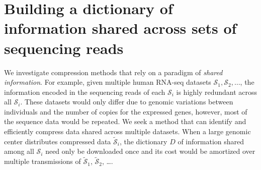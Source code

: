 \documentclass[12pt]{cmuthesis}
\begin{document}
  \begin{table}[ht]
    \centering
    \caption{\textbf{Performance of command-line compression tools on sequencing reads.} Reordering the reads improves reads compression by up to 5 times. Sizes shown are in megabytes.}
    \label{tab:compression:clt}
  \end{table}

\section{Building a dictionary of information shared across sets of sequencing reads}

  \newcommand{\seq}{\mathcal{S}\xspace}
  \newcommand{\compseq}{\widetilde{\mathcal{S}}\xspace}

  

  We investigate compression methods that rely on a paradigm of \textit{shared information}. For example, given multiple human RNA-seq datasets $\mathcal{ S}_1, \mathcal{ S}_2, \ldots$, the information encoded in the sequencing reads of each $\mathcal{ S}_i$ is highly redundant across all $\mathcal{S}_i$.  These datasets would only differ due to genomic variations between individuals and the number of copies for the expressed genes, however, most of the sequence data would be repeated. We seek a method that can identify and efficiently compress data shared across multiple datasets. When a large genomic center distributes compressed data $\mathcal{\widetilde S}_i$, the dictionary $D$ of information shared among all $\mathcal{S}_i$ need only be downloaded once and its cost would be amortized over multiple transmissions of $\mathcal{\widetilde S}_1$, $\mathcal{\widetilde S}_2$, \ldots.
\end{document}
